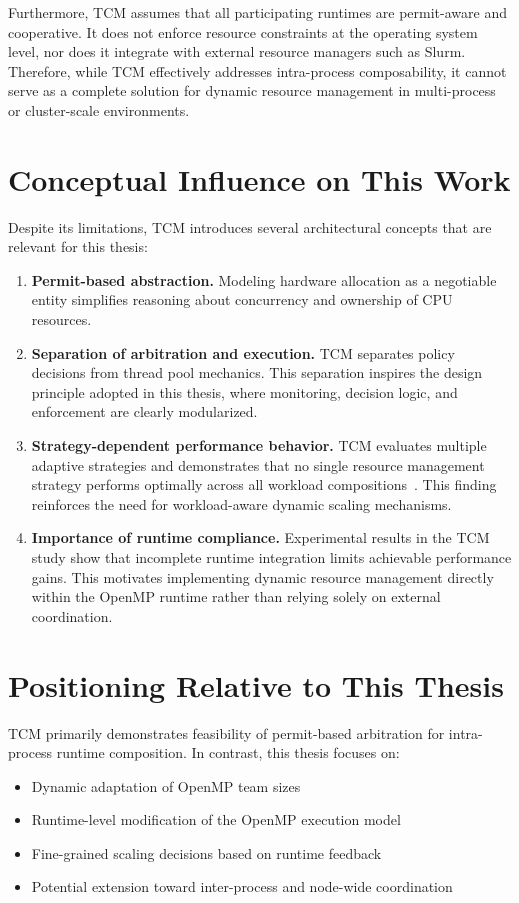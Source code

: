 Furthermore, TCM assumes that all participating runtimes are permit-aware and cooperative. It does not enforce resource constraints at the operating system level, nor does it integrate with external resource managers such as Slurm. Therefore, while TCM effectively addresses intra-process composability, it cannot serve as a complete solution for dynamic resource management in multi-process or cluster-scale environments.

\section{Conceptual Influence on This Work}

Despite its limitations, TCM introduces several architectural concepts that are relevant for this thesis:
\begin{enumerate}
  \item \textbf{Permit-based abstraction.} Modeling hardware allocation as a negotiable entity simplifies reasoning about concurrency and ownership of CPU resources.
  \item \textbf{Separation of arbitration and execution.} TCM separates policy decisions from thread pool mechanics. This separation inspires the design principle adopted in this thesis, where monitoring, decision logic, and enforcement are clearly modularized.
  \item \textbf{Strategy-dependent performance behavior.} TCM evaluates multiple adaptive strategies and demonstrates that no single resource management strategy performs optimally across all workload compositions~\parencite{fedotov_case_nodate}. This finding reinforces the need for workload-aware dynamic scaling mechanisms.
  \item \textbf{Importance of runtime compliance.} Experimental results in the TCM study show that incomplete runtime integration limits achievable performance gains. This motivates implementing dynamic resource management directly within the OpenMP runtime rather than relying solely on external coordination.
\end{enumerate}

\section{Positioning Relative to This Thesis}

TCM primarily demonstrates feasibility of permit-based arbitration for intra-process runtime composition. In contrast, this thesis focuses on:
\begin{itemize}
  \item Dynamic adaptation of OpenMP team sizes
  \item Runtime-level modification of the OpenMP execution model
  \item Fine-grained scaling decisions based on runtime feedback
  \item Potential extension toward inter-process and node-wide coordination
\end{itemize}

